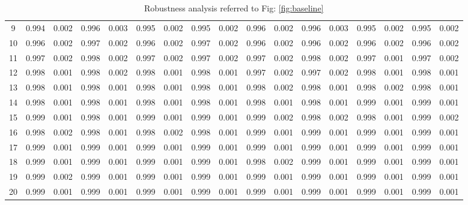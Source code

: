 \documentclass{article}
\begin{document}
\begin{table}[H]
{\begin{tabular}{|c|c|c|c|c|c|c|c|c|c|c|c|c|c|c|c|c|}
     9 & 0.994 & 0.002 & 0.996 & 0.003 & 0.995 & 0.002 & 0.995 & 0.002 & 0.996 & 0.002 & 0.996 & 0.003 & 0.995 & 0.002 & 0.995 & 0.002 \\ 
    10 & 0.996 & 0.002 & 0.997 & 0.002 & 0.996 & 0.002 & 0.997 & 0.002 & 0.996 & 0.002 & 0.996 & 0.002 & 0.996 & 0.002 & 0.996 & 0.002 \\ 
    11 & 0.997 & 0.002 & 0.998 & 0.002 & 0.997 & 0.002 & 0.997 & 0.002 & 0.997 & 0.002 & 0.998 & 0.002 & 0.997 & 0.001 & 0.997 & 0.002 \\ 
    12 & 0.998 & 0.001 & 0.998 & 0.002 & 0.998 & 0.001 & 0.998 & 0.001 & 0.997 & 0.002 & 0.997 & 0.002 & 0.998 & 0.001 & 0.998 & 0.001 \\ 
    13 & 0.998 & 0.001 & 0.998 & 0.001 & 0.998 & 0.001 & 0.998 & 0.001 & 0.998 & 0.002 & 0.998 & 0.001 & 0.998 & 0.002 & 0.998 & 0.001 \\ 
    14 & 0.998 & 0.001 & 0.998 & 0.001 & 0.998 & 0.001 & 0.998 & 0.001 & 0.998 & 0.001 & 0.998 & 0.001 & 0.999 & 0.001 & 0.999 & 0.001 \\ 
    15 & 0.999 & 0.001 & 0.998 & 0.001 & 0.999 & 0.001 & 0.999 & 0.001 & 0.999 & 0.002 & 0.998 & 0.002 & 0.998 & 0.001 & 0.999 & 0.002 \\ 
    16 & 0.998 & 0.002 & 0.998 & 0.001 & 0.998 & 0.002 & 0.998 & 0.001 & 0.999 & 0.001 & 0.999 & 0.001 & 0.999 & 0.001 & 0.999 & 0.001 \\ 
    17 & 0.999 & 0.001 & 0.999 & 0.001 & 0.999 & 0.001 & 0.999 & 0.001 & 0.999 & 0.001 & 0.999 & 0.001 & 0.999 & 0.001 & 0.999 & 0.001 \\ 
    18 & 0.999 & 0.001 & 0.999 & 0.001 & 0.999 & 0.001 & 0.999 & 0.001 & 0.998 & 0.002 & 0.999 & 0.001 & 0.999 & 0.001 & 0.999 & 0.001 \\ 
    19 & 0.999 & 0.002 & 0.999 & 0.001 & 0.999 & 0.001 & 0.999 & 0.001 & 0.999 & 0.001 & 0.999 & 0.001 & 0.999 & 0.001 & 0.999 & 0.001 \\ 
    20 & 0.999 & 0.001 & 0.999 & 0.001 & 0.999 & 0.001 & 0.999 & 0.001 & 0.999 & 0.001 & 0.999 & 0.001 & 0.999 & 0.001 & 0.999 & 0.001 \\ 
   \hline
\end{tabular}
}

\caption{Robustness analysis referred to Fig: \ref{fig:baseline}}
\label{tab:baseline}
\end{table} %
\end{document}
